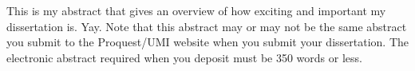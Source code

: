 This is my abstract that gives an overview of how exciting and important my dissertation is. Yay.
Note that this abstract may or may not be the same abstract you submit to the Proquest/UMI website when you submit your dissertation. The electronic abstract required when you deposit must be 350 words or less.